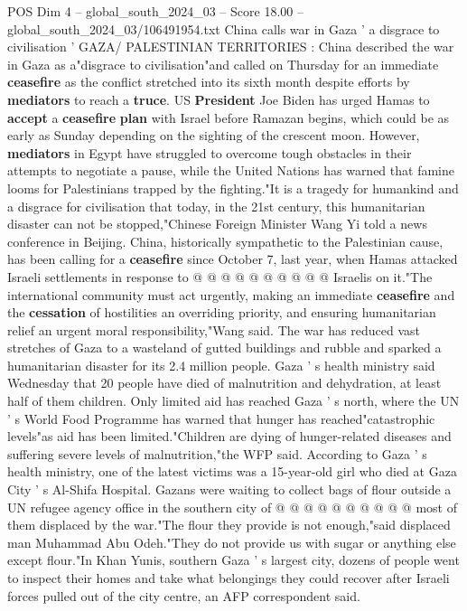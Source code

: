 \begin{textsample}{POS Dim 4 – global\_south\_2024\_03 – Score 18.00 – global\_south\_2024\_03/106491954.txt}  \label{ex:f4_pos_109}
China calls war in Gaza ' a disgrace to civilisation ' GAZA/ PALESTINIAN TERRITORIES : China described the war in Gaza as a"disgrace to civilisation"and called on Thursday for an immediate \textbf{ceasefire} as the conflict stretched into its sixth month despite efforts by \textbf{mediators} to reach a \textbf{truce}.
US \textbf{President} Joe Biden has urged Hamas to \textbf{accept} a \textbf{ceasefire} \textbf{plan} with Israel before Ramazan begins, which could be as early as Sunday depending on the sighting of the crescent moon.
However, \textbf{mediators} in Egypt have struggled to overcome tough obstacles in their attempts to negotiate a pause, while the United Nations has warned that famine looms for Palestinians trapped by the fighting."It is a tragedy for humankind and a disgrace for civilisation that today, in the 21st century, this humanitarian disaster can not be stopped,"Chinese Foreign Minister Wang Yi told a news conference in Beijing.
China, historically sympathetic to the Palestinian cause, has been calling for a \textbf{ceasefire} since October 7, last year, when Hamas attacked Israeli settlements in response to @ @ @ @ @ @ @ @ @ @ Israelis on it."The international community must act urgently, making an immediate \textbf{ceasefire} and the \textbf{cessation} of hostilities an overriding priority, and ensuring humanitarian relief an urgent moral responsibility,"Wang said.
The war has reduced vast stretches of Gaza to a wasteland of gutted buildings and rubble and sparked a humanitarian disaster for its 2.4 million people.
Gaza ' s health ministry said Wednesday that 20 people have died of malnutrition and dehydration, at least half of them children.
Only limited aid has reached Gaza ' s north, where the UN ' s World Food Programme has warned that hunger has reached"catastrophic levels"as aid has been limited."Children are dying of hunger-related diseases and suffering severe levels of malnutrition,"the WFP said.
According to Gaza ' s health ministry, one of the latest victims was a 15-year-old girl who died at Gaza City ' s Al-Shifa Hospital.
Gazans were waiting to collect bags of flour outside a UN refugee agency office in the southern city of @ @ @ @ @ @ @ @ @ @ most of them displaced by the war."The flour they provide is not enough,"said displaced man Muhammad Abu Odeh."They do not provide us with sugar or anything else except flour."In Khan Yunis, southern Gaza ' s largest city, dozens of people went to inspect their homes and take what belongings they could recover after Israeli forces pulled out of the city centre, an AFP correspondent said.

\end{textsample}
